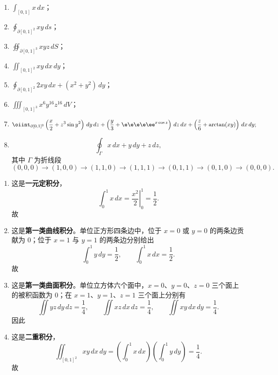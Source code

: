 ﻿

\begin{question}[指出积分类型并计算]

\begin{enumerate}[label=(\arabic*),leftmargin=2.6em,itemsep=0.25em,topsep=0.2em]
\item $\int_{[0,1]}x\,dx$；
\item $\oint_{\partial[0,1]^2}xy\,ds$；
\item $\oiint_{\partial[0,1]^3}xyz\,dS$；
\item $\iint_{[0,1]^2}xy\,dx\,dy$；
\item $\oint_{\partial[0,1]^2}2xy\,dx+(x^2+y^2)\,dy$；
\item $\iiint_{[0,1]^3}x^6y^{16}z^{16}\,dV$；
\item
\[
\oiint_{\partial[0,1]^3}\left(\frac{x}{2}+z^3\sin y^2\right)\,dy\,dz
+\left(\frac{y}{3}+\e\e\e\e\ee^{x\cos z}\right)\,dz\,dx
+\left(\frac{z}{6}+\arctan(xy)\right)\,dx\,dy;
\]
\item
\[
\oint_{\Gamma}x\,dx+y\,dy+z\,dz,
\]
其中 $\Gamma$ 为折线段
\[
(0,0,0)\to(1,0,0)\to(1,1,0)\to(1,1,1)\to(0,1,1)\to(0,1,0)\to(0,0,0).
\]
\end{enumerate}

\begin{solution}
\begin{enumerate}[label=(\arabic*),leftmargin=2.6em,itemsep=0.25em,topsep=0.2em]
\item 这是\textbf{一元定积分}，
\[
\int_0^1 x\,dx=\left.\frac{x^2}{2}\right|_0^1=\frac12.
\]
故

\item 这是\textbf{第一类曲线积分}。单位正方形四条边中，位于 $x=0$ 或 $y=0$ 的两条边贡献为 $0$；位于 $x=1$ 与 $y=1$ 的两条边分别给出
\[
\int_0^1 y\,dy=\frac12,
\qquad
\int_0^1 x\,dx=\frac12.
\]
故

\item 这是\textbf{第一类曲面积分}。单位立方体六个面中，$x=0$、$y=0$、$z=0$ 三个面上的被积函数为 $0$；在 $x=1$、$y=1$、$z=1$ 三个面上分别有
\[
\iint yz\,dy\,dz=\frac14,\qquad
\iint xz\,dx\,dz=\frac14,\qquad
\iint xy\,dx\,dy=\frac14.
\]
因此

\item 这是\textbf{二重积分}，
\[
\iint_{[0,1]^2}xy\,dx\,dy
=\left(\int_0^1 x\,dx\right)\left(\int_0^1 y\,dy\right)
=\frac14.
\]
故


\end{enumerate}
\end{solution}
\end{question}
